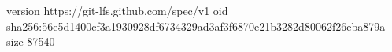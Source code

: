 version https://git-lfs.github.com/spec/v1
oid sha256:56e5d1400cf3a1930928df6734329ad3af3f6870e21b3282d80062f26eba879a
size 87540
